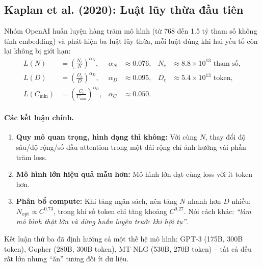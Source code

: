 \subsection{Kaplan et al. (2020): Luật lũy thừa đầu tiên}
\label{ssec:kaplan_scaling}
Nhóm OpenAI \cite{kaplan2020scaling} huấn luyện hàng trăm mô hình (từ 768 đến 1.5 tỷ tham số không tính embedding) và phát hiện ba luật lũy thừa, mỗi luật đúng khi hai yếu tố còn lại không bị giới hạn:
\begin{align}
	L(N) &= \left(\frac{N_c}{N}\right)^{\alpha_N}, & \alpha_N &\approx 0.076, & N_c &\approx 8.8 \times 10^{13} \text{ tham số},\\
	L(D) &= \left(\frac{D_c}{D}\right)^{\alpha_D}, & \alpha_D &\approx 0.095, & D_c &\approx 5.4 \times 10^{13} \text{ token},\\
	L(C_{\min}) &= \left(\frac{C_c}{C_{\min}}\right)^{\alpha_C}, & \alpha_C &\approx 0.050.
\end{align}

\paragraph{Các kết luận chính.}
\begin{enumerate}
	\item \textbf{Quy mô quan trọng, hình dạng thì không:} Với cùng $N$, thay đổi độ sâu/độ rộng/số đầu attention trong một dải rộng chỉ ảnh hưởng vài phần trăm loss.
	\item \textbf{Mô hình lớn hiệu quả mẫu hơn:} Mô hình lớn đạt cùng loss với ít token hơn.
	\item \textbf{Phân bổ compute:} Khi tăng ngân sách, nên tăng $N$ nhanh hơn $D$ nhiều: $N_{\text{opt}} \propto C^{0.73}$, trong khi số token chỉ tăng khoảng $C^{0.27}$. Nói cách khác: \emph{“làm mô hình thật lớn và dừng huấn luyện trước khi hội tụ”}.
\end{enumerate}
Kết luận thứ ba đã định hướng cả một thế hệ mô hình: GPT-3 (175B, 300B token), Gopher (280B, 300B token), MT-NLG (530B, 270B token) -- tất cả đều rất lớn nhưng “ăn” tương đối ít dữ liệu.

